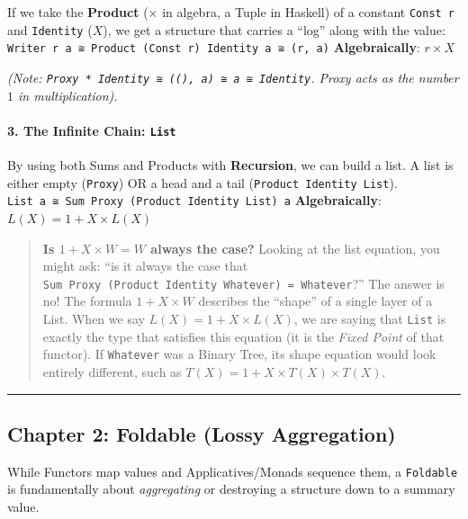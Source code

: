 \documentclass[
]{article}
\begin{document}
If we take the \textbf{Product} (\(\times\) in algebra, a Tuple in
Haskell) of a constant \texttt{Const\ r} and \texttt{Identity} (\(X\)),
we get a structure that carries a ``log'' along with the value:
\texttt{Writer\ r\ a\ ≅\ Product\ (Const\ r)\ Identity\ a\ ≅\ (r,\ a)}
\textbf{Algebraically}: \(r \times X\)

\emph{(Note:
\texttt{Proxy\ *\ Identity\ ≅\ ((),\ a)\ ≅\ a\ ≅\ Identity}. Proxy acts
as the number \(1\) in multiplication).}

\paragraph{\texorpdfstring{3. The Infinite Chain:
\texttt{List}}{3. The Infinite Chain: List}}\label{the-infinite-chain-list}

By using both Sums and Products with \textbf{Recursion}, we can build a
list. A list is either empty (\texttt{Proxy}) OR a head and a tail
(\texttt{Product\ Identity\ List}).
\texttt{List\ a\ ≅\ Sum\ Proxy\ (Product\ Identity\ List)\ a}
\textbf{Algebraically}: \(L(X) = 1 + X \times L(X)\)

\begin{quote}
\textbf{Is \(1 + X \times W = W\) always the case?} Looking at the list
equation, you might ask: ``is it always the case that
\texttt{Sum\ Proxy\ (Product\ Identity\ Whatever)\ =\ Whatever}?'' The
answer is no! The formula \(1 + X \times W\) describes the ``shape'' of
a single layer of a List. When we say \(L(X) = 1 + X \times L(X)\), we
are saying that \texttt{List} is exactly the type that satisfies this
equation (it is the \emph{Fixed Point} of that functor). If
\texttt{Whatever} was a Binary Tree, its shape equation would look
entirely different, such as \(T(X) = 1 + X \times T(X) \times T(X)\).
\end{quote}

\begin{center}\rule{0.5\linewidth}{0.5pt}\end{center}

\subsection{Chapter 2: Foldable (Lossy
Aggregation)}\label{chapter-2-foldable-lossy-aggregation}

While Functors map values and Applicatives/Monads sequence them, a
\texttt{Foldable} is fundamentally about \emph{aggregating} or
destroying a structure down to a summary value.
\end{document}
